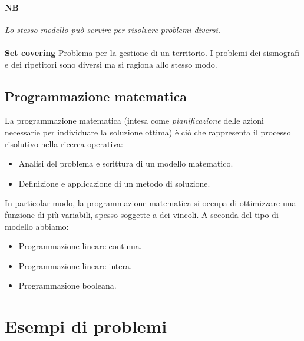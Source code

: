 \documentclass[12pt, twoside, letterpaper]{article}
\begin{document}
		\paragraph{NB}\textit{Lo stesso modello può servire per risolvere problemi diversi.}
		\\\\\textbf{Set covering }Problema per la gestione di un territorio. I problemi dei sismografi e dei ripetitori sono diversi ma si ragiona allo stesso modo.
		\subsection{Programmazione matematica} La programmazione matematica (intesa come \textit{pianificazione} delle azioni necessarie per individuare la soluzione ottima) è ciò che rappresenta il processo risolutivo nella ricerca operativa: 
			\begin{itemize}
				\item Analisi del problema e scrittura di un modello matematico.
				\item Definizione e applicazione di un metodo di soluzione.
			\end{itemize}
		In particolar modo, la programmazione matematica si occupa di ottimizzare una funzione di più variabili, spesso soggette a dei vincoli. A seconda del tipo di modello abbiamo:
		\begin{itemize}
			\item Programmazione lineare continua.
			\item Programmazione lineare intera.
			\item Programmazione booleana.
		\end{itemize}
	
	\section{Esempi di problemi}
	
\end{document}
